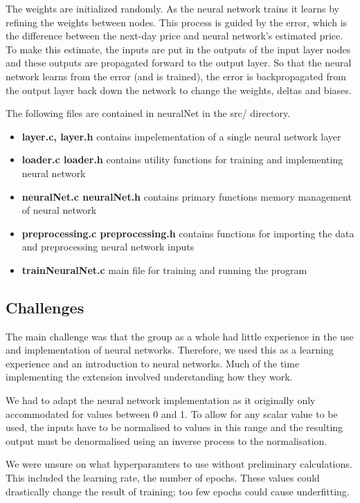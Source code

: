 \documentclass[11pt]{article}
\begin{document}
The weights are initialized randomly. As the neural network trains it learns by refining the weights between nodes. This process is guided by the error, which is the difference between the next-day price and neural network's estimated price. 
To make this estimate, the inputs are put in the outputs of the input layer nodes and these outputs are propagated forward to the output layer.
So that the neural network learns from the error (and is trained), the error is backpropagated from the output layer back down the network to change the weights, deltas and biases. 
\newline

The following files are contained in neuralNet in the src/ directory.
\begin{itemize}
    \item \textbf{layer.c, layer.h} contains impelementation of a single neural network layer 
    \item \textbf{loader.c loader.h} contains utility functions for training and implementing neural network
    \item \textbf{neuralNet.c neuralNet.h} contains primary functions memory management of neural network
    \item \textbf{preprocessing.c preprocessing.h} contains functions for importing the data and preprocessing neural network inputs
    \item \textbf{trainNeuralNet.c} main file for training and running the program
  \end{itemize}

\subsection{Challenges}
The main challenge was that the group as a whole had little experience in the use and implementation of neural networks. 
Therefore, we used this as a learning experience and an introduction to neural networks. 
Much of the time implementing the extension involved understanding how they work.

We had to adapt the neural network implementation as it originally only accommodated for values between 0 and 1.
To allow for any scalar value to be used, the inputs have to be normalised to values in this range
and the resulting output must be denormalised using an inverse process to the normalisation.

We were unsure on what hyperparamters to use without preliminary calculations. This included the learning rate, the number of epochs. These values could drastically change the result of training; too few epochs could cause underfitting. 
\end{document}

